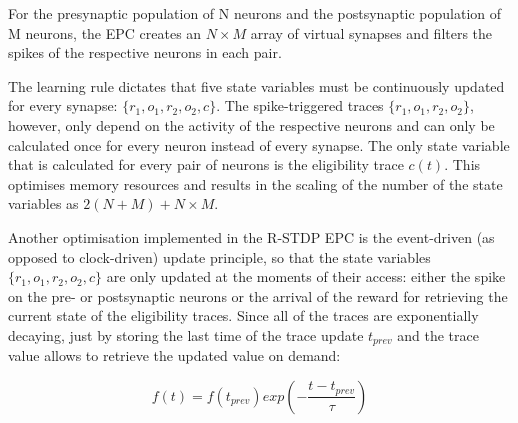 For the presynaptic population of N neurons and the postsynaptic population of M neurons, the EPC creates an $N \times M$ array of virtual synapses and filters the spikes of the respective neurons in each pair.

The learning rule dictates that five state variables must be continuously updated for every synapse: $\{r_1, o_1, r_2, o_2, c\}$. The spike-triggered traces $\{r_1, o_1, r_2, o_2\}$, however, only depend on the activity of the respective neurons and can only be calculated once for every neuron instead of every synapse. The only state variable that is calculated for every pair of neurons is the eligibility trace $c(t)$.
This optimises memory resources and results in the scaling of the number of the state variables as $2(N+M)+N \times M$.

Another optimisation implemented in the R-STDP EPC is the event-driven (as opposed to clock-driven) update principle, so that the state variables $\{r_1, o_1, r_2, o_2, c\}$ are only updated at the moments of their access: either the spike on the pre- or postsynaptic neurons or the arrival of the reward for retrieving the current state of the eligibility traces. Since all of the traces are exponentially decaying, just by storing the last time of the trace update $t_{prev}$ and the trace value allows to retrieve the updated value on demand:

\begin{equation}
    f(t) = f(t_{prev})exp\left(-\frac{t-t_{prev}}{\tau}\right)
    \label{eq:relaxate}
\end{equation}


